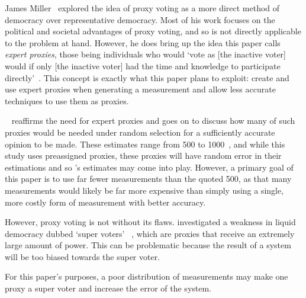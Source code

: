 James Miller~\cite{Miller1969} explored the idea of proxy voting as a more
direct method of democracy over representative democracy.
Most of his work focuses on the political and societal advantages of proxy
voting, and so is not directly applicable to the problem at hand.
However, he does bring up the idea this paper calls \textit{expert proxies},
those being individuals who would `vote as [the inactive voter] would if only
[the inactive voter] had the time and knowledge to participate
directly'~\cite[para.~1.3]{Miller1969}.
This concept is exactly what this paper plans to exploit: create and use expert
proxies when generating a measurement and allow less accurate techniques to use
them as proxies.

~\cite{Mueller1972} reaffirms the need for expert proxies and
goes on to discuss how many of such proxies would be needed under random
selection for a sufficiently accurate opinion to be made.
These estimates range from 500 to 1000~\cite[para.~3.2]{Mueller1972}, and
while this study uses preassigned proxies, these proxies will have random
error in their estimations and so 's estimates may come into
play.
However, a primary goal of this paper is to use far fewer measurements than the
quoted 500, as that many measurements would likely be far more expensive than
simply using a single, more costly form of measurement with better accuracy.

However, proxy voting is not without its flaws.
 investigated a weakness in liquid democracy dubbed `super voters'
~\cite[para.~1.3]{Golz2021}, which are proxies that receive an extremely large
amount of power.
This can be problematic because the result of a system will be too biased
towards the super voter.  

For this paper's purposes, a poor distribution of measurements may make one
proxy a super voter and increase the error of the system.




